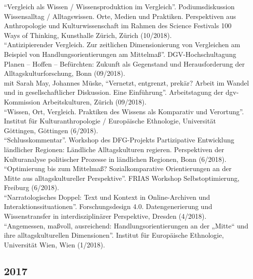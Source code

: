 \enquote{Vergleich als Wissen / Wissensproduktion im Vergleich}. Podiumsdiskussion Wissensalltag / Alltagswissen. Orte, Medien und Praktiken. Perspektiven aus Anthropologie und Kulturwissenschaft im Rahmen des Science Festivals 100 Ways of Thinking, Kunsthalle Zürich, Zürich (10/2018).\\[.25cm]\enquote{Antizipierender Vergleich. Zur zeitlichen Dimensionierung von Vergleichen am Beispiel von Handlungsorientierungen am Mittelmaß}. DGV-Hochschultagung Planen – Hoffen – Befürchten: Zukunft als Gegenstand und Herausforderung der Alltagskulturforschung, Bonn (09/2018).\\[.25cm]mit Sarah May, Johannes Müske, \enquote{Vernetzt, entgrenzt, prekär? Arbeit im Wandel und in gesellschaftlicher Diskussion. Eine Einführung}. Arbeitstagung der dgv-Kommission Arbeitskulturen, Zürich (09/2018).\\[.25cm]\enquote{Wissen, Ort, Vergleich. Praktiken des Wissens als Komparativ und Verortung}. Institut für Kulturanthropologie / Europäische Ethnologie, Universität Göttingen, Göttingen (6/2018).\\[.25cm]\enquote{Schlusskommentar}. Workshop des DFG-Projekts Partizipative Entwicklung ländlicher Regionen: Ländliche Alltagskulturen regieren. Perspektiven der Kulturanalyse politischer Prozesse in ländlichen Regionen, Bonn (6/2018).\\[.25cm]\enquote{Optimierung bis zum Mittelmaß? Sozialkomparative Orientierungen an der Mitte aus alltagskultureller Perspektive}. FRIAS Workshop Selbstoptimierung, Freiburg (6/2018).\\[.25cm]\enquote{Narratologisches Doppel: Text und Kontext in Online-Archiven und Interaktionssituationen}. Forschungsdesign 4.0. Datengenerierung und Wissenstransfer in interdisziplinärer Perspektive, Dresden (4/2018).\\[.25cm]\enquote{Angemessen, maßvoll, ausreichend: Handlungsorientierungen an der „Mitte“ und ihre alltagskulturellen Dimensionen}. Institut für Europäische Ethnologie, Universität Wien, Wien (1/2018).\subsection*{2017}
